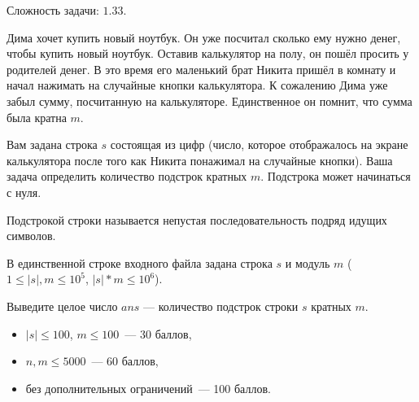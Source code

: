 
\Legend
Сложность задачи: $1.33$.

Дима хочет купить новый ноутбук. Он уже посчитал сколько ему нужно денег, чтобы купить новый ноутбук. Оставив калькулятор на полу, он пошёл просить у родителей денег. В это время его маленький брат Никита пришёл в комнату и начал нажимать на случайные кнопки калькулятора. К сожалению Дима уже забыл сумму, посчитанную на калькуляторе. Единственное он помнит, что сумма была кратна $m$.

Вам задана строка $s$ состоящая из цифр (число, которое отображалось на экране калькулятора после того как Никита понажимал на случайные кнопки). Ваша задача определить количество подстрок кратных $m$. Подстрока может начинаться с нуля.

Подстрокой строки называется непустая последовательность подряд идущих символов.

\Input
В единственной строке входного файла задана строка $s$ и модуль $m$ ($1 \le |s|, m \le 10^5$, $|s| * m \le 10^6$).

\Output
Выведите целое число $ans$ — количество подстрок строки $s$ кратных $m$.

\Samples
\BeginTests
\EndTests

\Scoring
\begin{itemize}
	\item $|s| \le 100$, $m \le 100$~--- 30 баллов,
	\item $n, m \le 5000$~--- 60 баллов,
	\item без дополнительных ограничений~--- 100 баллов.
\end{itemize}

\EndProblem

